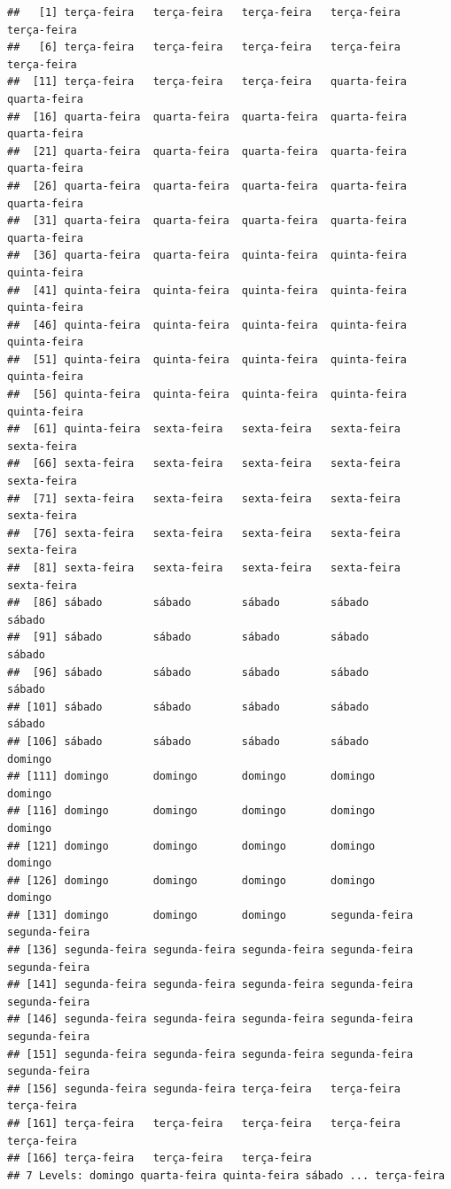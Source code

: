 \documentclass[]{book}
\theoremstyle{definition}
\theoremstyle{definition}
\theoremstyle{definition}
\theoremstyle{remark}
\begin{document}
\begin{verbatim}
##   [1] terça-feira   terça-feira   terça-feira   terça-feira   terça-feira  
##   [6] terça-feira   terça-feira   terça-feira   terça-feira   terça-feira  
##  [11] terça-feira   terça-feira   terça-feira   quarta-feira  quarta-feira 
##  [16] quarta-feira  quarta-feira  quarta-feira  quarta-feira  quarta-feira 
##  [21] quarta-feira  quarta-feira  quarta-feira  quarta-feira  quarta-feira 
##  [26] quarta-feira  quarta-feira  quarta-feira  quarta-feira  quarta-feira 
##  [31] quarta-feira  quarta-feira  quarta-feira  quarta-feira  quarta-feira 
##  [36] quarta-feira  quarta-feira  quinta-feira  quinta-feira  quinta-feira 
##  [41] quinta-feira  quinta-feira  quinta-feira  quinta-feira  quinta-feira 
##  [46] quinta-feira  quinta-feira  quinta-feira  quinta-feira  quinta-feira 
##  [51] quinta-feira  quinta-feira  quinta-feira  quinta-feira  quinta-feira 
##  [56] quinta-feira  quinta-feira  quinta-feira  quinta-feira  quinta-feira 
##  [61] quinta-feira  sexta-feira   sexta-feira   sexta-feira   sexta-feira  
##  [66] sexta-feira   sexta-feira   sexta-feira   sexta-feira   sexta-feira  
##  [71] sexta-feira   sexta-feira   sexta-feira   sexta-feira   sexta-feira  
##  [76] sexta-feira   sexta-feira   sexta-feira   sexta-feira   sexta-feira  
##  [81] sexta-feira   sexta-feira   sexta-feira   sexta-feira   sexta-feira  
##  [86] sábado        sábado        sábado        sábado        sábado       
##  [91] sábado        sábado        sábado        sábado        sábado       
##  [96] sábado        sábado        sábado        sábado        sábado       
## [101] sábado        sábado        sábado        sábado        sábado       
## [106] sábado        sábado        sábado        sábado        domingo      
## [111] domingo       domingo       domingo       domingo       domingo      
## [116] domingo       domingo       domingo       domingo       domingo      
## [121] domingo       domingo       domingo       domingo       domingo      
## [126] domingo       domingo       domingo       domingo       domingo      
## [131] domingo       domingo       domingo       segunda-feira segunda-feira
## [136] segunda-feira segunda-feira segunda-feira segunda-feira segunda-feira
## [141] segunda-feira segunda-feira segunda-feira segunda-feira segunda-feira
## [146] segunda-feira segunda-feira segunda-feira segunda-feira segunda-feira
## [151] segunda-feira segunda-feira segunda-feira segunda-feira segunda-feira
## [156] segunda-feira segunda-feira terça-feira   terça-feira   terça-feira  
## [161] terça-feira   terça-feira   terça-feira   terça-feira   terça-feira  
## [166] terça-feira   terça-feira   terça-feira  
## 7 Levels: domingo quarta-feira quinta-feira sábado ... terça-feira
\end{verbatim}
\end{document}
